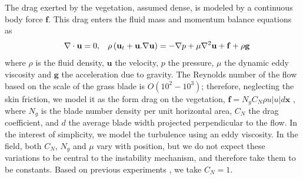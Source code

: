 \documentclass[aps,preprint,12pt]{revtex4-1}  %
\newcommand{\bx}{{\boldsymbol{\hat{x}}}}
\newcommand{\bu}{\mathbf{u}}
\newcommand{\grad}{\mathbf{\nabla}}
\begin{document}
The drag exerted by the vegetation, assumed dense, is modeled by a continuous body force $\mathbf{f}$.
This drag enters the fluid mass and momentum balance equations as 
\begin{equation}
\quad \grad\cdot\bu = 0,\hspace{3mm} \rho \left(\bu_{t}+\bu.\grad\bu \right) = -\grad p+\mu\grad^{2}\bu +\mathbf{f}+\rho\mathbf{g}
\label{navier-stokes}
\end{equation}
where $\rho$ is the fluid density, $\mathbf{u}$ the velocity, 
$p$ the pressure, $\mu$ the dynamic eddy viscosity and $\mathbf{g}$ the acceleration due to gravity. 
The Reynolds number of the flow based on the scale of the grass blade is $O(10^2-10^3)$; therefore, neglecting the skin friction, we model it as the form drag on the vegetation, $\mathbf{f}=N_g C_N \rho u |u| d\bx$ \cite{Nepf99,Nepf00,Nepf04}, where  $N_g$ is the blade number density per unit horizontal area, $C_{N}$ the drag coefficient, and $d$ the average blade width projected perpendicular to the flow. 
In the interest of simplicity, we model the turbulence using an eddy viscosity. 
In the field, both $C_N$, $N_g$ and $\mu$ vary with position, but we do not expect these variations to be central to the instability mechanism, and therefore take them to be constants. 
Based on previous experiments \cite{Vivoni98,Nepf00}, we take $C_N = 1$.
\end{document}
